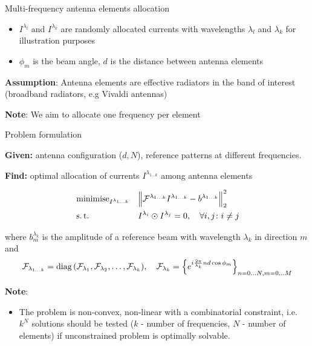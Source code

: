 \documentclass[../main.tex]{subfiles}
\begin{document}
\begin{frame}[t]{Multi-frequency antenna elements allocation}
\begin{itemize}
	\item $I^{\lambda_{l}}$ and $I^{\lambda_{k}}$  are randomly allocated currents with wavelengths $\lambda_l$ and $\lambda_k$ for illustration purposes
	\item $\phi_{m}$ is the beam angle, $d$ is the distance between antenna elements
\end{itemize}

\textbf{Assumption}:
Antenna elements are effective radiators in the band of interest (broadband radiators, e.g Vivaldi antennas)

\textbf{Note}:
We aim to allocate one frequency per element

\end{frame}


%
%

\begin{frame}[t]{Problem formulation}

\textbf{Given:} antenna configuration ($d, N$), reference patterns at different frequencies.

\textbf{Find:} optimal allocation of currents $I^{\lambda_{1\ldots k}}$ among antenna elements
    
\begin{equation*}
\begin{aligned}
& \operatorname{minimise}_{I^{\lambda_{1\ldots k}}} 
& & \Big\| \mathcal{F}^{\lambda_{1 \ldots k}} I^{\lambda_{1\ldots k}} - b^{\lambda_{1 \ldots k}} \Big\|_2^2 \\
& \operatorname{s.t.}
& & I^{\lambda_i} \odot I^{\lambda_j} = 0, \quad \forall i, j \colon i \ne j \\
\end{aligned}
\end{equation*}

where $b^{\lambda_{k}}_m$ is the amplitude of a reference beam with wavelength $\lambda_{k}$ in direction $m$ and
\begin{equation*}
  \mathcal{F}_{\lambda_{1 \ldots k}} = \operatorname{diag}{(\mathcal{F}_{\lambda_1}, \mathcal{F}_{\lambda_2}, \ldots, \mathcal{F}_{\lambda_k})}, \quad \mathcal{F}_{\lambda_{k}} = \Big\{ e^{i \frac{2\pi}{\lambda_k}n d \cos{\phi_m}} \Big\}_{n=0\ldots N, m = 0\ldots M}
\end{equation*}

\textbf{Note}: 
\begin{itemize}
    \item The problem is non-convex, non-linear with a combinatorial constraint, i.e. $k^N$ solutions should be tested ($k$ - number of frequencies, $N$ - number of elements) if unconstrained problem is optimally solvable.
\end{itemize}

\end{frame}
\end{document}
